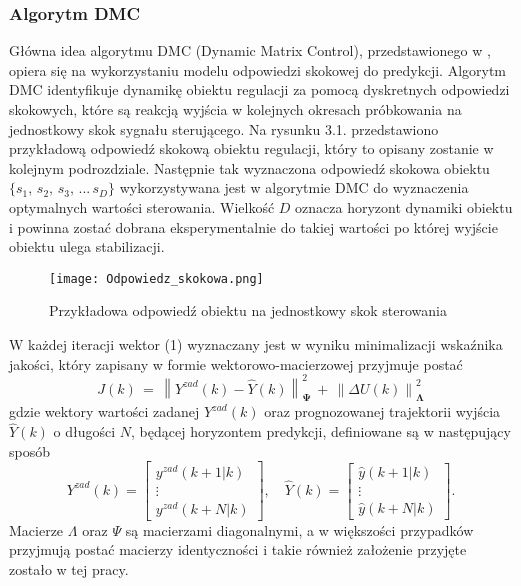 \subsubsection{Algorytm DMC}
Główna idea algorytmu DMC (Dynamic Matrix Control), przedstawionego w \cite{dmc1979}, opiera się na wykorzystaniu modelu odpowiedzi skokowej do predykcji. Algorytm DMC identyfikuje dynamikę obiektu regulacji za pomocą dyskretnych odpowiedzi skokowych, które są reakcją wyjścia w kolejnych okresach próbkowania na jednostkowy skok sygnału sterującego. Na rysunku 3.1. przedstawiono przykładową odpowiedź skokową obiektu regulacji, który to opisany zostanie w kolejnym podrozdziale. Następnie tak wyznaczona odpowiedź skokowa obiektu \(\{s_1,\, s_2,\, s_3,\, ...\, s_D \}\) wykorzystywana jest w algorytmie DMC do wyznaczenia optymalnych wartości sterowania. Wielkość \(D\) oznacza horyzont dynamiki obiektu i powinna zostać dobrana eksperymentalnie do takiej wartości po której wyjście obiektu ulega stabilizacji. 
\begin{figure}[!h]
    \label{fig:Odpowiedz-skokowa}
    \centering \texttt{[image: Odpowiedz\_skokowa.png]}
    \caption{Przykładowa odpowiedź obiektu na jednostkowy skok sterowania}
\end{figure}
\par W każdej iteracji wektor (1) wyznaczany jest w wyniku minimalizacji wskaźnika jakości, który zapisany w formie wektorowo-macierzowej przyjmuje postać
\begin{equation}
J(k) \, = \, \left\| Y^{zad}(k) - \hat{Y}(k) \right\|_{\bm{\Psi}}^2 \,+ \,\left\| \Delta U(k) \right\|_{\bm{\Lambda}}^2
\end{equation}
gdzie wektory wartości zadanej \( Y^{zad}(k) \) oraz prognozowanej trajektorii wyjścia \( \hat{Y}(k) \) o długości \( N \),  będącej horyzontem predykcji, definiowane są w następujący sposób
\begin{equation}
Y^{zad}(k) =
	 \begin{bmatrix}
		y^{zad}(k+1|k) \\
		\vdots \\
		y^{zad}(k+N|k)
	\end{bmatrix} , \quad
\hat{Y}(k) = 
	\begin{bmatrix}
		\hat{y}(k+1|k) \\
		\vdots \\
		\hat{y}(k+N|k)
	\end{bmatrix}.
\end{equation}
Macierze \( \Lambda\) oraz \( \Psi\) są macierzami diagonalnymi, a w większości przypadków przyjmują postać macierzy identyczności i takie również założenie przyjęte zostało w tej pracy. 
